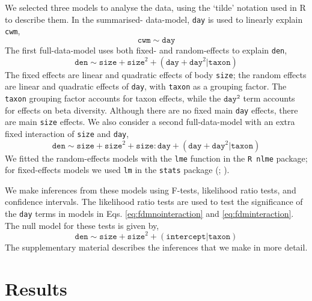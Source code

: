 \documentclass[12pt]{ecology}
\begin{document}
We selected three models to analyse the data, using the \citet{WilkinsonAndRogers1973} `tilde' notation used in R to describe them.  In the summarised- data-model, \texttt{day} is used to linearly explain \texttt{cwm},
\begin{equation}
\mathtt{cwm} \sim \mathtt{day}
\label{eq:sdm}
\end{equation}
The first full-data-model uses both fixed- and random-effects to explain \texttt{den},
\begin{equation}
\mathtt{den} \sim \mathtt{size} + \mathtt{size}^2 + (\mathtt{day} + \mathtt{day}^2 | \mathtt{taxon})
\label{eq:fdmnointeraction}
\end{equation}
The fixed effects are linear and quadratic effects of body \texttt{size}; the random effects are linear and quadratic effects of \texttt{day}, with \texttt{taxon} as a grouping factor.  The \texttt{taxon} grouping factor accounts for taxon effects, while the $\mathtt{day^2}$ term accounts for effects on beta diversity.  Although there are no fixed main \texttt{day} effects, there are main \texttt{size} effects.  We also consider a second full-data-model with an extra fixed interaction of \texttt{size} and \texttt{day},
\begin{equation}
\mathtt{den} \sim \mathtt{size} + \mathtt{size}^2 + \mathtt{size:day} + (\mathtt{day} + \mathtt{day}^2 | \mathtt{taxon})
\label{eq:fdminteraction}
\end{equation}
We fitted the random-effects models with the \texttt{lme} function in the \texttt{R nlme} package; for fixed-effects models we used \texttt{lm} in the \texttt{stats} package (; ).

We make inferences from these models using F-tests, likelihood ratio tests, and confidence intervals.  The likelihood ratio tests are used to test the significance of the \texttt{day} terms in models in Eqs. \ref{eq:fdmnointeraction} and \ref{eq:fdminteraction}.  The null model for these tests is given by,
\begin{equation}
\mathtt{den} \sim \mathtt{size} + \mathtt{size}^2 + (\mathtt{intercept} | \mathtt{taxon})
\label{eq:fdmnull}
\end{equation}
The supplementary material describes the inferences that we make in more detail.

\section{Results}
\end{document}
